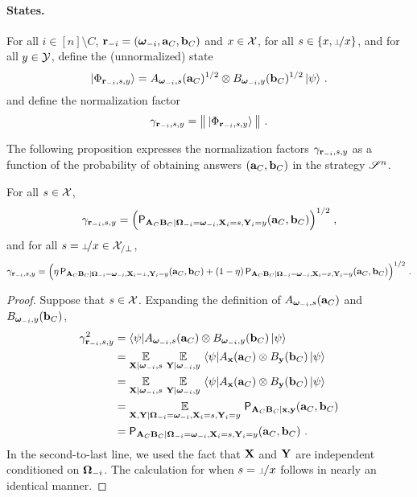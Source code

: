 \paragraph{States.}  For all $i \in [n] \setminus C$, $\mathbf{r}_{-i} = ({\boldsymbol{\omega}}_{-i},\mathbf{a}_C,\mathbf{b}_C)$ and $x \in \mathcal{X}$, for all $s \in \{x,\dummyx\}$, and for all $y \in \mathcal{Y}$, define the (unnormalized) state
\begin{equation}\label{eq:def-state-y}
	{|\Phi_{\mathbf{r}_{-i},s,y}\rangle} = A_{{\boldsymbol{\omega}}_{-i},s}(\mathbf{a}_C)^{1/2} \otimes B_{{\boldsymbol{\omega}}_{-i},y}(\mathbf{b}_C)^{1/2} \, {|\psi\rangle}~.
\end{equation}
and define the normalization factor
\begin{equation}\label{eq:def-gamma}
	\gamma_{\mathbf{r}_{-i},s,y} = \big \| \, {|\Phi_{\mathbf{r}_{-i},s,y}\rangle} \, \big \|~.
\end{equation}

The following proposition expresses the normalization factors $\gamma_{\mathbf{r}_{-i},s,y}$ as a function of the probability of obtaining answers $(\mathbf{a}_C,\mathbf{b}_C)$ in the strategy $\mathscr{S}^n$. 

\begin{proposition}
\label{prop:gamma}
For all $s \in \mathcal{X}$, 
\begin{equation}\label{eq:gamma-def-1}
	\gamma_{\mathbf{r}_{-i},s,y} = \Big( \mathsf{P}_{\mathbf{A}_C \mathbf{B}_C | {\boldsymbol{\Omega}}_{-i} = {\boldsymbol{\omega}}_{-i}, \mathbf{X}_i = s, \mathbf{Y}_i = y}(\mathbf{a}_C,\mathbf{b}_C) \Big)^{1/2}\;,
\end{equation}
and for all $s = \dummyx \in \X_{/\perp}$,
\begin{equation}\label{eq:gamma-def-2}
	\gamma_{\br_\mi,s,y} = \Big( \eta \, \P_{\bA_C \bB_C | \bOmega_\mi = \bomega_\mi, \bX_i = \dummy, \bY_i = y}(\ba_C,\bb_C) + (1 - \eta) \, \P_{\bA_C \bB_C | \bOmega_\mi = \bomega_\mi, \bX_i = x, \bY_i = y}(\ba_C,\bb_C)\Big)^{1/2}~.
\end{equation}
\end{proposition}

\begin{proof}
Suppose that $s \in \mathcal{X}$. Expanding the definition of $ A_{{\boldsymbol{\omega}}_{-i},s}(\mathbf{a}_C)$ and $B_{{\boldsymbol{\omega}}_{-i},y}(\mathbf{b}_C)$,
\begin{align*}
	\gamma_{\mathbf{r}_{-i},s,y}^2 &= {\langle\psi|} A_{{\boldsymbol{\omega}}_{-i},s}(\mathbf{a}_C) \otimes B_{{\boldsymbol{\omega}}_{-i},y}(\mathbf{b}_C) \, {|\psi\rangle} \\
	&= \operatorname*{\mathbb{E}}_{\mathbf{X} | {\boldsymbol{\omega}}_{-i}, s} \, \operatorname*{\mathbb{E}}_{\mathbf{Y} | {\boldsymbol{\omega}}_{-i}, y} \, {\langle\psi|} A_{\mathbf{x}}(\mathbf{a}_C) \otimes B_{\mathbf{y}}(\mathbf{b}_C) \, {|\psi\rangle} \\
	&= \operatorname*{\mathbb{E}}_{\mathbf{X} | {\boldsymbol{\omega}}_{-i}, s} \, \operatorname*{\mathbb{E}}_{\mathbf{Y} | {\boldsymbol{\omega}}_{-i}, y} \, {\langle\psi|} A_{\mathbf{x}}(\mathbf{a}_C) \otimes B_{\mathbf{y}}(\mathbf{b}_C) \, {|\psi\rangle} \\
	&= \operatorname*{\mathbb{E}}_{\mathbf{X}, \mathbf{Y} | {\boldsymbol{\Omega}}_{-i} = {\boldsymbol{\omega}}_{-i}, \mathbf{X}_i = s, \mathbf{Y}_i = y} \, \mathsf{P}_{\mathbf{A}_C \mathbf{B}_C | \mathbf{x}, \mathbf{y}}(\mathbf{a}_C,\mathbf{b}_C) \\
	&= \mathsf{P}_{\mathbf{A}_C \mathbf{B}_C | {\boldsymbol{\Omega}}_{-i} = {\boldsymbol{\omega}}_{-i}, \mathbf{X}_i = s,\mathbf{Y}_i = y}(\mathbf{a}_C,\mathbf{b}_C)~.
\end{align*}
In the second-to-last line, we used the fact that $\mathbf{X}$ and $\mathbf{Y}$ are independent conditioned on ${\boldsymbol{\Omega}}_{-i}$. 
The calculation for when $s = \dummyx$ follows in nearly an identical manner.
\end{proof}

